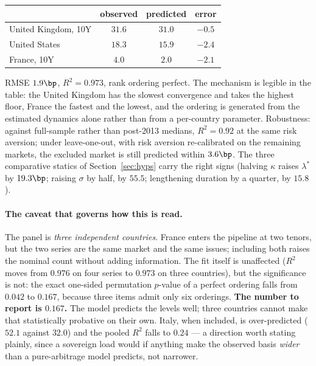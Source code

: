 \documentclass[11pt]{article}
\begin{document}
\begin{center}
\begin{tabular}{lccc}
\toprule
 & observed & predicted & error \\
\midrule
United Kingdom, 10Y & $31.6$ & $31.0$ & $-0.5$ \\
United States       & $18.3$ & $15.9$ & $-2.4$ \\
France, 10Y         & $4.0$  & $2.0$  & $-2.1$ \\
\bottomrule
\end{tabular}
\end{center}

\noindent RMSE $1.9\bp$, $R^{2}=0.973$, rank ordering perfect. The mechanism is legible in the
table: the United Kingdom has the slowest convergence and takes the highest floor, France the
fastest and the lowest, and the ordering is generated from the estimated dynamics alone rather than
from a per-country parameter. Robustness: against full-sample rather than post-2013 medians,
$R^{2}=0.92$ at the same risk aversion; under leave-one-out, with risk aversion re-calibrated on
the remaining markets, the excluded market is still predicted within $3.6\bp$. The three
comparative statics of Section~\ref{sec:hyps} carry the right signs (halving $\kappa$ raises
$\lambda^{\ast}$ by $19.3\bp$; raising $\sigma$ by half, by $55.5$; lengthening duration by a
quarter, by $15.8$).

\paragraph{The caveat that governs how this is read.} The panel is \emph{three independent
countries}. France enters the pipeline at two tenors, but the two series are the same market and
the same issues; including both raises the nominal count without adding information. The fit itself
is unaffected ($R^{2}$ moves from $0.976$ on four series to $0.973$ on three countries), but the
significance is not: the exact one-sided permutation $p$-value of a perfect ordering falls from
$0.042$ to $\mathbf{0.167}$, because three items admit only six orderings. \textbf{The number to
report is $0.167$.} The model predicts the levels well; three countries cannot make that
statistically probative on their own. Italy, when included, is over-predicted ($52.1$ against
$32.0$) and the pooled $R^{2}$ falls to $0.24$ --- a direction worth stating plainly, since a
sovereign load would if anything make the observed basis \emph{wider} than a pure-arbitrage model
predicts, not narrower.
\end{document}
